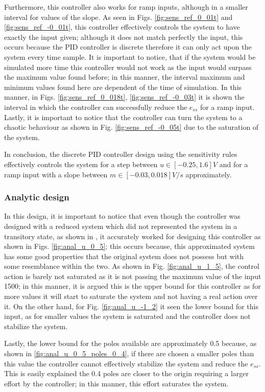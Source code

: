 Furthermore, this controller also works for ramp inputs, although in a smaller interval for values of the slope. As seen in Figs. \ref{fig:sens_ref_0_01t} and \ref{fig:sens_ref_-0_01t}, this controller effectively controls the system to have exactly the input given; although it does not match perfectly the input, this occurs because the PID controller is discrete therefore it can only act upon the system every time sample. It is important to notice, that if the system would be simulated more time this controller would not work as the input would surpass the maximum value found before; in this manner, the interval maximum and minimum values found here are dependent of the time of simulation. In this manner, in Figs. \ref{fig:sens_ref_0_018t}, \ref{fig:sens_ref_-0_03t} it is shown the interval in which the controller can successfully reduce the $e_{ss}$ for a ramp input. Lastly, it is important to notice that the controller can turn the system to a chaotic behaviour as shown in Fig. \ref{fig:sens_ref_-0_05t} due to the saturation of the system.

In conclusion, the discrete PID controller design using the sensitivity rules effectively controls the system for a step between $u \in [-0.25, 1.6]V$ and for a ramp input with a slope between $m \in [-0.03, 0.018]V/s$ approximately. 

\subsubsection{Analytic design}
In this design, it is important to notice that even though the controller was designed with a reduced system which did not represented the system in a transitory state, as shown in \cite{JS_PL2}, it accurately worked for designing this controller as shown in Figs. \ref{fig:anal_u_0_5}; this occurs because, this approximated system has some good properties that the original system does not possess but with some resemblance within the two. As shown in Fig. \ref{fig:anal_u_1_5}, the control action is barely not saturated as it is not passing the maximum value of the input 1500; in this manner, it is argued this is the upper bound for this controller as for more values it will start to saturate the system and not having a real action over it. On the other hand, for Fig. \ref{fig:anal_u_-1_2} it seen the lower bound for this input, as for smaller values the system is saturated and the controller does not stabilize the system.

Lastly, the lower bound for the poles available are approximately 0.5 because, as shown in \ref{fig:anal_u_0_5_poles_0_4}, if there are chosen a smaller poles than this value the controller cannot effectively stabilize the system and reduce the $e_{ss}$. This is easily explained the 0.4 poles are closer to the origin requiring a larger effort by the controller; in this manner, this effort saturates the system.

